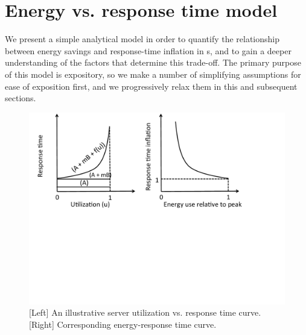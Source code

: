 \section{Energy vs. response time model}
\label{sec:analysis}

We present a simple analytical model in order to quantify the relationship between energy savings and response-time inflation in \cdc s, and to gain a deeper understanding of the factors that determine this trade-off. The primary purpose of this model is expository, so we make a number of simplifying assumptions for ease of exposition first, and we progressively relax them in this and subsequent sections.



\begin{figure}
\centering
\includegraphics[scale=0.36]{figures/model.pdf}
\vspace{-1.5in}
\caption{[Left] An illustrative server utilization vs. response time curve. [Right] Corresponding energy-response time curve.}
\label{fig:model}
\end{figure}

